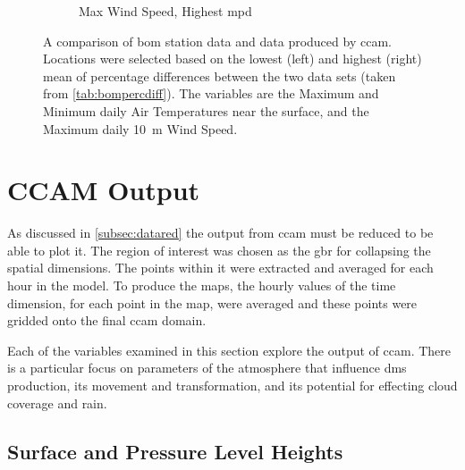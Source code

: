 \begin{figure}[!hbt]
\begin{subfigure}[b]{0.45\textwidth}
		\caption{Max Wind Speed, Highest \gls{mpd}}
		\label{subfig:maxthamilton}
	\end{subfigure}
    \caption{A comparison of \gls{bom} station data and data produced by \gls{ccam}. Locations were selected based on the lowest (left) and highest (right) mean of percentage differences between the two data sets (taken from \cref{tab:bompercdiff}). The variables are the Maximum and Minimum daily Air Temperatures near the surface, and the Maximum daily \SI{10}{\m} Wind Speed.}
    \label{fig:bomcompdata}
\end{figure}

\clearpage
\section{CCAM Output}
\label{sec:ccamoutput}

As discussed in \cref{subsec:datared} the output from \gls{ccam} must be reduced to be able to plot it. The region of interest was chosen as the \gls{gbr} for collapsing the spatial dimensions. The points within it were extracted and averaged for each hour in the model. To produce the maps, the hourly values of the time dimension, for each point in the map, were averaged and these points were gridded onto the final \gls{ccam} domain.

Each of the variables examined in this section explore the output of \gls{ccam}. There is a particular focus on parameters of the atmosphere that influence \gls{dms} production, its movement and transformation, and its potential for effecting cloud coverage and rain.

\subsection{Surface and Pressure Level Heights}
\label{subsec:heights}

